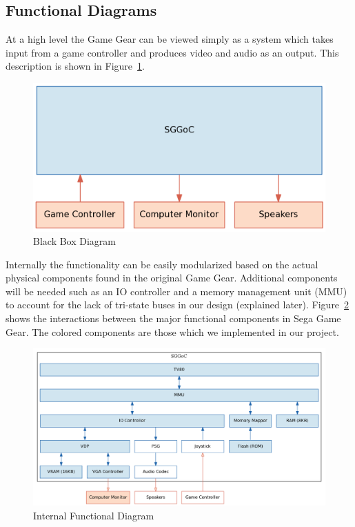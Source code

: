 \documentclass{article}
\begin{document}
\newpage
\subsection{Functional Diagrams}
At a high level the Game Gear can be viewed simply as a system which takes
input from a game controller and produces video and audio as an output. This
description is shown in Figure~\ref{fig:external}.

\begin{figure}[H]
\centering
\includegraphics[scale=0.4]{../block_diagrams/block_diagram_external.png}
\caption{Black Box Diagram}
\label{fig:external}
\end{figure}

Internally the functionality can be easily modularized based on the actual
physical components found in the original Game Gear. Additional components will
be needed such as an IO controller and a memory management unit (MMU) to
account for the lack of tri-state buses in our design (explained later).
Figure~\ref{fig:internal} shows the interactions between the major functional
components in Sega Game Gear. The colored components are those which we
implemented in our project.

\begin{figure}[H]
\centering
\includegraphics[scale=0.4]{../block_diagrams/block_diagram_internal_implemented.png}
\caption{Internal Functional Diagram}
\label{fig:internal}
\end{figure}
\end{document}
